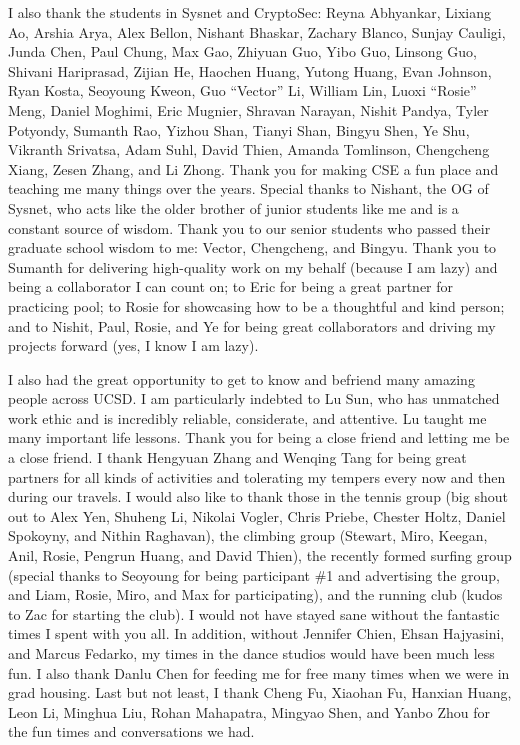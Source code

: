 \begin{acknowledgements}
I also thank the students in Sysnet and CryptoSec: Reyna Abhyankar, Lixiang Ao, Arshia Arya, Alex Bellon, Nishant Bhaskar, Zachary Blanco, Sunjay Cauligi, Junda Chen, Paul Chung, Max Gao, Zhiyuan Guo, Yibo Guo, Linsong Guo, Shivani Hariprasad, Zijian He, Haochen Huang, Yutong Huang, Evan Johnson, Ryan Kosta, Seoyoung Kweon, Guo ``Vector'' Li, William Lin, Luoxi ``Rosie'' Meng, Daniel Moghimi, Eric Mugnier, Shravan Narayan, Nishit Pandya, Tyler Potyondy, Sumanth Rao, Yizhou Shan, Tianyi Shan, Bingyu Shen, Ye Shu, Vikranth Srivatsa, Adam Suhl, David Thien, Amanda Tomlinson, Chengcheng Xiang, Zesen Zhang, and Li Zhong.
Thank you for making CSE a fun place and teaching me many things over the years. Special thanks to Nishant, the OG of Sysnet, who acts like the older brother of junior students like me and is a constant source of wisdom. Thank you to our senior students who passed their graduate school wisdom to me: Vector, Chengcheng, and Bingyu. Thank you to Sumanth for delivering high-quality work on my behalf (because I am lazy) and being a collaborator I can count on; to Eric for being a great partner for practicing pool; to Rosie for showcasing how to be a thoughtful and kind person; and to Nishit, Paul, Rosie, and Ye for being great collaborators and driving my projects forward (yes, I know I am lazy).

I also had the great opportunity to get to know and befriend many amazing people across UCSD. I am particularly indebted to Lu Sun, who has unmatched work ethic and is incredibly reliable, considerate, and attentive. Lu taught me many important life lessons. Thank you for being a close friend and letting me be a close friend. I thank Hengyuan Zhang and Wenqing Tang for being great partners for all kinds of activities and tolerating my tempers every now and then during our travels. I would also like to thank those in the tennis group (big shout out to Alex Yen, Shuheng Li, Nikolai Vogler, Chris Priebe, Chester Holtz, Daniel Spokoyny, and Nithin Raghavan), the climbing group (Stewart, Miro, Keegan, Anil, Rosie, Pengrun Huang, and David Thien), the recently formed surfing group (special thanks to Seoyoung for being participant \#1 and advertising the group, and Liam, Rosie, Miro, and Max for participating), and the running club (kudos to Zac for starting the club). I would not have stayed sane without the fantastic times I spent with you all. In addition, without Jennifer Chien, Ehsan Hajyasini, and Marcus Fedarko, my times in the dance studios would have been much less fun. I also thank Danlu Chen for feeding me for free many times when we were in grad housing. Last but not least, I thank Cheng Fu, Xiaohan Fu, Hanxian Huang, Leon Li,  Minghua Liu, Rohan Mahapatra, Mingyao Shen, and Yanbo Zhou for the fun times and conversations we had.


\end{acknowledgements}
